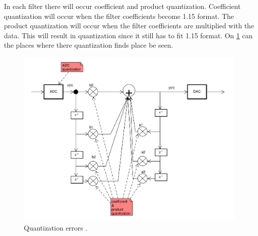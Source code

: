 In each filter there will occur coefficient and product quantization. Coefficient quantization will occur when the filter coefficients become 1.15 format. The product quantization will occur when the filter coefficients are multiplied with the data. This will result in quantization since it still has to fit 1.15 format. On \cref{fig:quant_error} can the places where there quantization finds place be seen. 
\begin{figure}
	\centering
	\includegraphics[width=1\linewidth]{gfx/Design/flow_quant_error.pdf}
	\caption{Quantization errors \systemName.}
	\label{fig:quant_error}
\end{figure}


\FloatBarrier